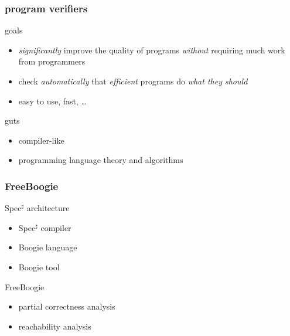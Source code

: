 \documentclass{beamer}
\title{\titletext}
\author{Radu Grigore}
\subtitle{\url{http://code.google.com/p/freeboogie}}
\date{23 August 2010}
\newcommand{\specsharp}{Spec$^\sharp$\xspace}
\begin{document}
\maketitle
\begin{frame}
  \frametitle{program verifiers}
  \begin{block}{goals}
  \begin{itemize}
  \item
    \emph{significantly} improve the quality of programs 
    \emph{without} requiring much work from programmers
  \item 
    check \emph{automatically} that \emph{efficient} programs do
    \emph{what they should}
  \item
    easy to use, fast, \dots
  \end{itemize}
  \end{block}

  \begin{block}{guts}
  \begin{itemize}
  \item compiler-like
  \item programming language theory and algorithms
  \end{itemize}
  \end{block}
\end{frame}
\begin{frame}
  \frametitle{FreeBoogie}
  \begin{block}{\specsharp architecture}
  \begin{itemize}
  \item \specsharp compiler 
  \item Boogie language
  \item Boogie tool 
  \end{itemize}
  \end{block}
  \begin{block}{FreeBoogie}
  \begin{itemize}
  \item partial correctness analysis
  \item \alert{reachability analysis}
  \end{itemize}
  \end{block}
\end{frame}
\end{document}
